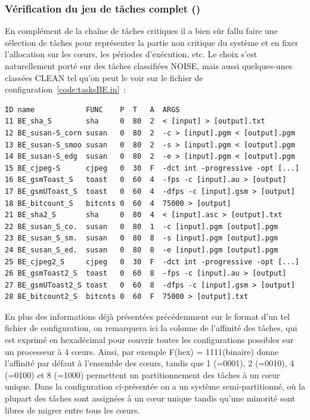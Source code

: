 \documentclass[french, a4paper, 11pt, twoside, pdftex]{StyleThese}
\begin{document}
\subsubsection{Vérification du jeu de tâches complet ()}

En complément de la chaîne de tâches critiques il a bien sûr fallu faire une sélection de tâches pour représenter la partie non critique du système et en fixer l'allocation sur les cœurs, les périodes d'exécution, etc.
Le choix s'est naturellement porté sur des tâches classifiées NOISE, mais aussi quelques-unes classées CLEAN tel qu'on peut le voir sur le fichier de configuration~\ref{code:tasksBE.in}~: 

\begin{lstlisting}[basicstyle=\footnotesize\ttfamily, caption={Tâches non critiques sélectionnées}, numbers=none, label={code:tasksBE.in}]
ID name            FUNC    P  T   A  ARGS
11 BE_sha_S        sha     0  80  2  < [input] > [output].txt
12 BE_susan-S_corn susan   0  80  2  -c > [input].pgm < [output].pgm
13 BE_susan-S_smoo susan   0  80  2  -s > [input].pgm < [output].pgm
14 BE_susan-S_edg  susan   0  80  2  -e > [input].pgm < [output].pgm
15 BE_cjpeg-S      cjpeg   0  30  F  -dct int -progressive -opt [...]
16 BE_gsmToast_S   toast   0  60  4  -fps -c [input].au > [output]
17 BE_gsmUToast_S  toast   0  60  4  -dfps -c [input].gsm > [output]
18 BE_bitcount_S   bitcnts 0  60  4  75000 > [output]
21 BE_sha2_S       sha     0  80  4  < [input].asc > [output].txt
22 BE_susan_S_co.  susan   0  80  1  -c [input].pgm [output].pgm
23 BE_susan_S_sm.  susan   0  80  8  -s [input].pgm [output].pgm
24 BE_susan_S_ed.  susan   0  80  8  -e [input].pgm [output].pgm
25 BE_cjpeg2_S     cjpeg   0  30  F  -dct int -progressive -opt [...]
26 BE_gsmToast2_S  toast   0  60  8  -fps -c [input].au > [output]
27 BE_gsmUToast2_S toast   0  60  8  -dfps -c [input].gsm > [output]
28 BE_bitcount2_S  bitcnts 0  60  F  75000 > [output].txt
\end{lstlisting}

En plus des informations déjà présentées précédemment sur le format d'un tel fichier de configuration, on remarquera ici la colonne de l'affinité des tâches, qui est exprimé en hexadécimal pour couvrir toutes les configurations possibles sur un processeur à 4 cœurs. Ainsi, par exemple F(hex) = 1111(binaire) donne l'affinité par défaut à l'ensemble des cœurs, tandis que 1 (=0001), 2 (=0010), 4 (=0100) et 8 (=1000) permettent un partitionnement des tâches à un cœur unique. Dans la configuration ci-présentée on a un système semi-partitionné, où la plupart des tâches sont assignées à un cœur unique tandis qu'une minorité sont libres de migrer entre tous les cœurs.
\end{document}
